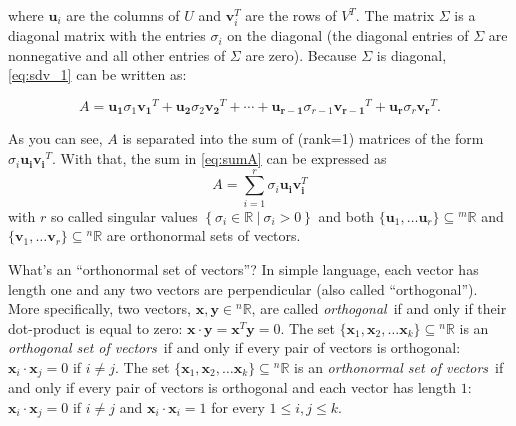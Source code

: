 \documentclass[10pt,addpoints]{exam} %
\newcommand{\mblue}[1]{\color{blue}\textit{#1}\color{black}}
\newcommand{\nR}{{}^{n}\mathbb{R}}
\newcommand{\mR}{{}^{m}\mathbb{R}}
\begin{document}
\begin{questions}
where $\mathbf{u}_i$ are the columns of $U$ and $\mathbf{v}^T_i$ are the rows of $V^T$. The matrix
$\Sigma$ is a diagonal matrix with the entries $\sigma_i$ on the diagonal (the diagonal entries of
$\Sigma$ are nonnegative and all other entries of $\Sigma$ are zero). Because $\Sigma$ is diagonal,
\cref{eq:sdv_1} can be written as:

    \begin{equation}
      \label{eq:sumA}
      A=\mathbf{u}_{\mathbf{1}} \sigma_1 \mathbf{v}_{\mathbf{1}}{
      }^T+\mathbf{u}_{\mathbf{2}} \sigma_2 \mathbf{v}_{\mathbf{2}}{
      }^T+\cdots+\mathbf{u}_{\mathbf{r}-\mathbf{1}} \sigma_{r-1}
      \mathbf{v}_{\mathbf{r}-\mathbf{1}}{ }^T+\mathbf{u}_{\mathbf{r}} \sigma_r
      \mathbf{v}_{\mathbf{r}}{ }^T.
    \end{equation}
    
    
    As you can see, $A$ is separated into the sum of (rank=1) matrices of the
    form $\sigma_i \mathbf{u}_{\mathbf{i}}\mathbf{v}_{\mathbf{i}}{ }^T$. With
    that, the sum in \cref{eq:sumA} can be expressed as
    \begin{equation}
      \label{eq:2}
      A=\sum_{i=1}^r \sigma_i \mathbf{u}_{\mathbf{i}} \mathbf{v}_{\mathbf{i}}^T
    \end{equation}
    with $r$ so called singular values
    $\left\{\sigma_i \in \mathbb{R}~|~\sigma_i > 0\right\}$ and
    both $\{ \mathbf{u}_1, \dots \mathbf{u}_r \} \subseteq \mR$ and 
    $\{ \mathbf{v}_1, \dots \mathbf{v}_r \} \subseteq \nR$ are orthonormal sets of vectors.
    
    What's an ``orthonormal set of vectors''?  In simple language, each vector has length one and
    any two vectors are perpendicular (also called ``orthogonal'').  More specifically, two vectors,
    $\mathbf{x}, \mathbf{y} \in \nR$, are called \mblue{orthogonal}\ if and only if their
    dot-product is equal to zero: $\mathbf{x} \cdot \mathbf{y} = \mathbf{x}^T\mathbf{y} = 0$.  The
    set $\{\mathbf{x}_1,\mathbf{x}_2,\dots \mathbf{x}_k\} \subseteq \nR$ is an \mblue{orthogonal set
      of vectors}\ if and only if every pair of vectors is orthogonal:
    $\mathbf{x}_i \cdot \mathbf{x}_j = 0 $ if $i \neq j$.  The set
    $\{\mathbf{x}_1,\mathbf{x}_2,\dots \mathbf{x}_k\} \subseteq \nR$ is an \mblue{orthonormal set of
      vectors}\ if and only if every pair of vectors is orthogonal and each vector has length $1$:
    $\mathbf{x}_i \cdot \mathbf{x}_j = 0 $ if $i \neq j$ and $\mathbf{x}_i \cdot \mathbf{x}_i = 1$
    for every $1 \leq i, j \leq k$.
      

\end{questions}
\end{document}
